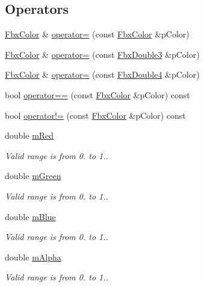 \subsection*{Operators}
\begin{DoxyCompactItemize}
\item 
\hyperlink{class_fbx_color}{Fbx\+Color} \& \hyperlink{class_fbx_color_ae1810b5b2286fa939f106e8d5adc5011}{operator=} (const \hyperlink{class_fbx_color}{Fbx\+Color} \&p\+Color)
\item 
\hyperlink{class_fbx_color}{Fbx\+Color} \& \hyperlink{class_fbx_color_af509c1a34ba01aca1207975fa36ebc07}{operator=} (const \hyperlink{fbxtypes_8h_ae0a96f14cde566774c7553aa7523b7a7}{Fbx\+Double3} \&p\+Color)
\item 
\hyperlink{class_fbx_color}{Fbx\+Color} \& \hyperlink{class_fbx_color_a5398fb758068706d35318cd145092c0f}{operator=} (const \hyperlink{fbxtypes_8h_a03dddc7979e0016f74a095b1943d97a3}{Fbx\+Double4} \&p\+Color)
\item 
bool \hyperlink{class_fbx_color_abba90fcb84b470c432abae17c2e1a347}{operator==} (const \hyperlink{class_fbx_color}{Fbx\+Color} \&p\+Color) const
\item 
bool \hyperlink{class_fbx_color_a3f7caa78c7c9140670ad4a5f1cc32b62}{operator!=} (const \hyperlink{class_fbx_color}{Fbx\+Color} \&p\+Color) const
\end{DoxyCompactItemize}
\begin{DoxyCompactItemize}
\item 
double \hyperlink{class_fbx_color_aa58094c2415fa965bdf1e760892baa5c}{m\+Red}
\begin{DoxyCompactList}\small\item\em Valid range is from 0. to 1.. \end{DoxyCompactList}\item 
double \hyperlink{class_fbx_color_a43ba888941f635304a7ed885ccfed776}{m\+Green}
\begin{DoxyCompactList}\small\item\em Valid range is from 0. to 1.. \end{DoxyCompactList}\item 
double \hyperlink{class_fbx_color_abf621ccd7dc31e50019c7bdde90dfe5e}{m\+Blue}
\begin{DoxyCompactList}\small\item\em Valid range is from 0. to 1.. \end{DoxyCompactList}\item 
double \hyperlink{class_fbx_color_a06c58f40181499882190574926d335ec}{m\+Alpha}
\begin{DoxyCompactList}\small\item\em Valid range is from 0. to 1.. \end{DoxyCompactList}\end{DoxyCompactItemize}


